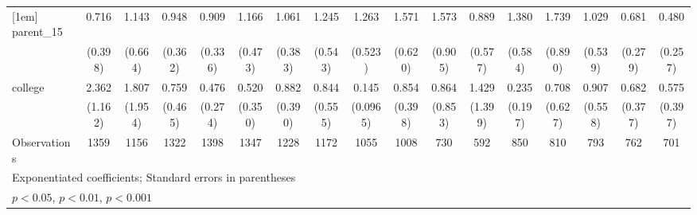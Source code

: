 {\begin{tabular}{l*{16}{c}}
[1em]
parent\_15           &       0.716         &       1.143         &       0.948         &       0.909         &       1.166         &       1.061         &       1.245         &       1.263         &       1.571         &       1.573         &       0.889         &       1.380         &       1.739         &       1.029         &       0.681         &       0.480         \\
                    &     (0.398)         &     (0.664)         &     (0.362)         &     (0.336)         &     (0.473)         &     (0.383)         &     (0.543)         &     (0.523)         &     (0.620)         &     (0.905)         &     (0.577)         &     (0.584)         &     (0.890)         &     (0.539)         &     (0.279)         &     (0.257)         \\
[1em]
college             &       2.362         &       1.807         &       0.759         &       0.476         &       0.520         &       0.882         &       0.844         &       0.145\sym{**} &       0.854         &       0.864         &       1.429         &       0.235         &       0.708         &       0.907         &       0.682         &       0.575         \\
                    &     (1.162)         &     (1.954)         &     (0.465)         &     (0.274)         &     (0.350)         &     (0.390)         &     (0.555)         &    (0.0965)         &     (0.398)         &     (0.853)         &     (1.399)         &     (0.197)         &     (0.627)         &     (0.558)         &     (0.377)         &     (0.397)         \\
\hline
Observations        &        1359         &        1156         &        1322         &        1398         &        1347         &        1228         &        1172         &        1055         &        1008         &         730         &         592         &         850         &         810         &         793         &         762         &         701         \\
\hline\hline
\multicolumn{17}{l}{\footnotesize Exponentiated coefficients; Standard errors in parentheses}\\
\multicolumn{17}{l}{\footnotesize \sym{*} \(p<0.05\), \sym{**} \(p<0.01\), \sym{***} \(p<0.001\)}\\
\end{tabular}
}
